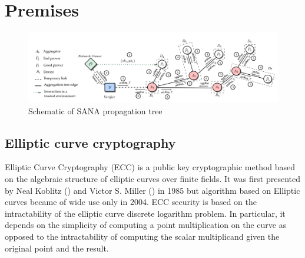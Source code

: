 \section{Premises}

\begin{figure}
	\includegraphics[width=0.9\linewidth]{Images/SANA_general.png} %
	\caption{Schematic of SANA propagation tree} %
\end{figure}

\subsection{Elliptic curve cryptography}
Elliptic Curve Cryptography (ECC) is a public key
cryptographic method based on the algebraic structure of elliptic curves over
finite fields.
It was first presented by Neal Koblitz (\cite{ecc_kob}) and Victor S. Miller (\cite{ecc_mil}) in 1985 but algorithm based on Elliptic curves became of wide use only in 2004.
ECC security is based on the intractability of the elliptic
curve discrete logarithm problem.
In particular, it depends on the simplicity of computing a point multiplication 
on the curve as opposed to the intractability of computing the scalar multiplicand
given the original point and the result.

